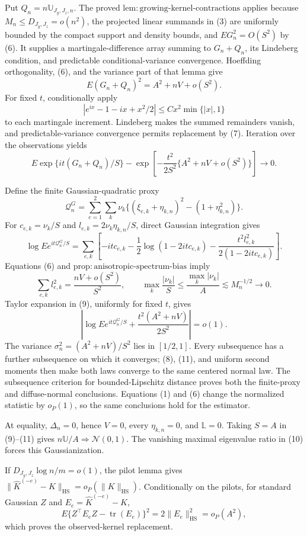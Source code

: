 Put \(Q_n=n\mathbb U_{J_y,J_z,n}\). The proved \(\mathrm{lem{:}growing\text{-}kernel\text{-}contractions}\) applies because \(M_n\le D_{J_y,J_z}=o(n^2)\), the projected linear summands in (3) are uniformly bounded by the compact support and density bounds, and \(E G_n^2=O(S^2)\) by (6). It supplies a martingale-difference array summing to \(G_n+Q_n\), its Lindeberg condition, and predictable conditional-variance convergence. Hoeffding orthogonality, (6), and the variance part of that lemma give
\[
E(G_n+Q_n)^2=A^2+nV+o(S^2).                                     \tag{7}
\]
For fixed \(t\), conditionally apply
\[
|e^{ix}-1-ix+x^2/2|\le Cx^2\min\{|x|,1\}
\]
to each martingale increment. Lindeberg makes the summed remainders vanish, and predictable-variance convergence permits replacement by (7). Iteration over the observations yields
\[
E\exp\{it(G_n+Q_n)/S\}
-\exp\left[-\frac{t^2}{2S^2}\{A^2+nV+o(S^2)\}\right]\to0.     \tag{8}
\]

Define the finite Gaussian-quadratic proxy
\[
\mathcal Q_n^G=\sum_{e=1}^2\sum_k\nu_k\{(\xi_{e,k}+\eta_{k,n})^2-(1+\eta_{k,n}^2)\}.
\]
For \(c_{e,k}=\nu_k/S\) and \(l_{e,k}=2\nu_k\eta_{k,n}/S\), direct Gaussian integration gives
\[
\log Ee^{it\mathcal Q_n^G/S}
=\sum_{e,k}\left[-itc_{e,k}-\frac12\log(1-2itc_{e,k})
-\frac{t^2l_{e,k}^2}{2(1-2itc_{e,k})}\right].                   \tag{9}
\]
Equations (6) and \(\mathrm{prop{:}anisotropic\text{-}spectrum\text{-}bias}\) imply
\[
\sum_{e,k}l_{e,k}^2=\frac{nV+o(S^2)}{S^2},
\qquad
\max_k\frac{|\nu_k|}{S}\le\frac{\max_k|\nu_k|}{A}\lesssim M_n^{-1/2}\to0. \tag{10}
\]
Taylor expansion in (9), uniformly for fixed \(t\), gives
\[
\left|\log Ee^{it\mathcal Q_n^G/S}+\frac{t^2(A^2+nV)}{2S^2}\right|=o(1). \tag{11}
\]
The variance \(\sigma_n^2=(A^2+nV)/S^2\) lies in \([1/2,1]\). Every subsequence has a further subsequence on which it converges; (8), (11), and uniform second moments then make both laws converge to the same centered normal law. The subsequence criterion for bounded-Lipschitz distance proves both the finite-proxy and diffuse-normal conclusions. Equations (1) and (6) change the normalized statistic by \(o_P(1)\), so the same conclusions hold for the estimator.

At equality, \(\Delta_n=0\), hence \(V=0\), every \(\eta_{k,n}=0\), and \(\mathbb L=0\). Taking \(S=A\) in (9)--(11) gives \(n\mathbb U/A\Rightarrow\mathcal N(0,1)\). The vanishing maximal eigenvalue ratio in (10) forces this Gaussianization.

If \(D_{J_y,J_z}\log n/m=o(1)\), the pilot lemma gives \(\|\widehat K^{(-e)}-K\|_{\mathrm{HS}}=o_P(\|K\|_{\mathrm{HS}})\). Conditionally on the pilots, for standard Gaussian \(Z\) and \(E_e=\widehat K^{(-e)}-K\),
\[
E\{Z^\top E_eZ-\operatorname{tr}(E_e)\}^2=2\|E_e\|_{\mathrm{HS}}^2=o_P(A^2), \tag{12}
\]
which proves the observed-kernel replacement.

